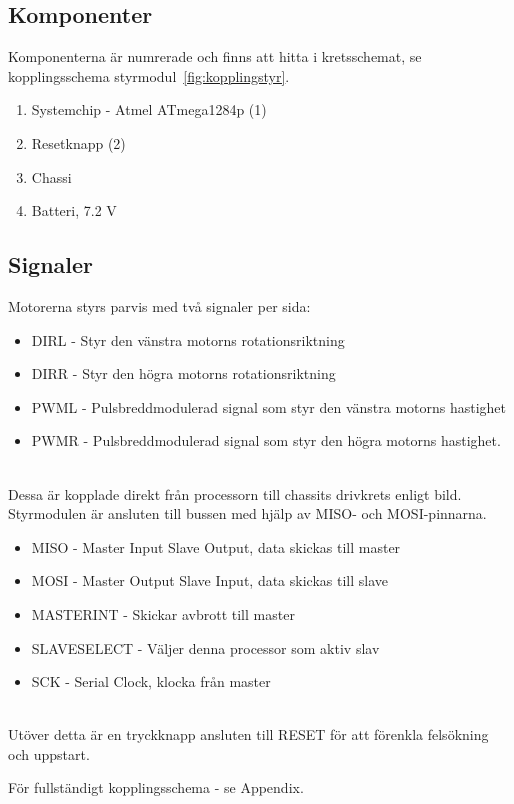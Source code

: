 \documentclass[a4paper,12pt,fleqn]{article}
\begin{document}

\subsection{Komponenter}
Komponenterna är numrerade och finns att hitta i kretsschemat, se kopplingsschema styrmodul~\ref{fig:kopplingstyr}.
\begin{enumerate}
	\item Systemchip - Atmel ATmega1284p (1)
	\item Resetknapp (2)
	\item Chassi
	\item Batteri, 7.2 V
\end{enumerate}
\subsection{Signaler}
Motorerna styrs parvis med två signaler per sida:
\begin{itemize}
	\item DIRL - Styr den vänstra motorns rotationsriktning
	\item DIRR - Styr den högra motorns rotationsriktning
	\item PWML - Pulsbreddmodulerad signal som styr den vänstra motorns hastighet
	\item PWMR - Pulsbreddmodulerad signal som styr den högra motorns hastighet.
\end{itemize}
~\\
Dessa är kopplade direkt från processorn till chassits drivkrets enligt bild.
Styrmodulen är ansluten till bussen med hjälp av MISO- och MOSI-pinnarna.

\begin{itemize}
	\item MISO - Master Input Slave Output, data skickas till master
	\item MOSI - Master Output Slave Input, data skickas till slave
	\item MASTERINT - Skickar avbrott till master
	\item SLAVESELECT - Väljer denna processor som aktiv slav
	\item SCK - Serial Clock, klocka från master
\end{itemize}
~\\
Utöver detta är en tryckknapp ansluten till RESET för att förenkla felsökning och uppstart. 

För fullständigt kopplingsschema - se Appendix. 
\end{document}
